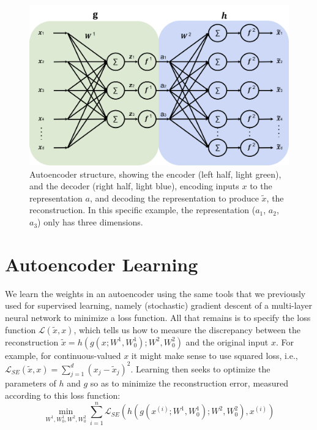 \begin{figure}[h]
  \centering
  \includegraphics[width= .8\textwidth]{figures/autoencoder.png}
  \caption{\small Autoencoder structure, showing the encoder (left
    half, light green), and the decoder (right half, light blue),
    encoding inputs $x$ to the representation $a$, and decoding the
    representation to produce $\tilde{x}$, the reconstruction.  In
    this specific example, the representation ($a_1$, $a_2$, $a_3$)
    only has three dimensions.\label{fig:autoencoder}}
\end{figure}

\newpage
\section{Autoencoder Learning}

We learn the weights in an autoencoder using the same tools that we previously used for
supervised learning, namely (stochastic) gradient descent of a
multi-layer neural network to minimize a loss function. All that
remains is to specify the loss function $\mathcal{L}(\tilde{x}, x)$, which tells
us how to measure the discrepancy between the reconstruction
$\tilde{x} = h(g(x; W^{1}, W^1_0); W^{2}, W^2_0)$ and the original input $x$. For
example, for continuous-valued $x$ it might make sense to use squared
loss, i.e., $\mathcal{L}_{SE}(\tilde{x}, x) = \sum_{j=1}^{d} (x_j -
  \tilde{x}_j)^2$. Learning then seeks to optimize the
parameters of $h$ and $g$ so as to minimize the reconstruction error,
measured according to this loss function:
\[
  \min_{W^{1}, W^1_0, W^{2}, W^2_0} \sum_{i=1}^n \mathcal{L}_{SE}\left(h(g(x^{(i)}; W^{1}, W^1_0); W^{2}, W^2_0), x^{(i)}\right)
\]

